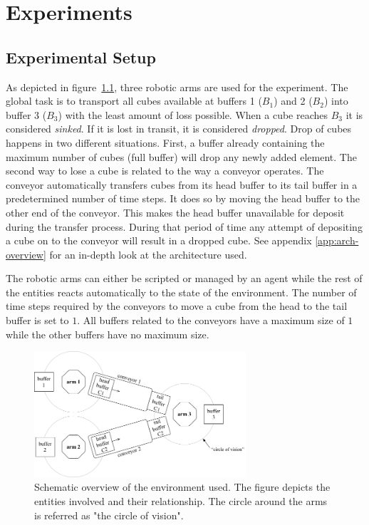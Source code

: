 \chapter{Experiments}
\label{chap:experiments}	

\section{Experimental Setup}
\label{sec:experimentat-setup}

As depicted in figure~\ref{fig:scenario}, three robotic arms are used for the experiment. The global task is to transport all cubes available at buffers 1 ($B_1$) and 2 ($B_2$) into buffer 3 ($B_3$) with the least amount of loss possible. When a cube reaches $B_3$ it is considered \textit{sinked}. If it is lost in transit, it is considered \textit{dropped}. Drop of cubes happens in two different situations. First, a buffer already containing the maximum number of cubes (full buffer) will drop any newly added element. The second way to lose a cube is related to the way a conveyor operates. The conveyor automatically transfers cubes from its head buffer to its tail buffer in a predetermined number of time steps. It does so by moving the head buffer to the other end of the conveyor. This makes the head buffer unavailable for deposit during the transfer process. During that period of time any attempt of depositing a cube on to the conveyor will result in a dropped cube. See appendix \ref{app:arch-overview} for an in-depth look at the architecture used.  

The robotic arms can either be scripted or managed by an agent while the rest of the entities reacts automatically to the state of the environment. The number of time steps required by the conveyors to move a cube from the head to the tail buffer is set to $1$. All buffers related to the conveyors have a maximum size of $1$ while the other buffers have no maximum size.

\begin{figure}[ht]
\centering
\includegraphics[width=0.7\textwidth]{imgs/scenario.png}
\caption[Scenario overview]{Schematic overview of the environment used. The figure depicts the entities involved and their relationship. The circle around the arms is referred as "the circle of vision".}
\label{fig:scenario}
\end{figure}


